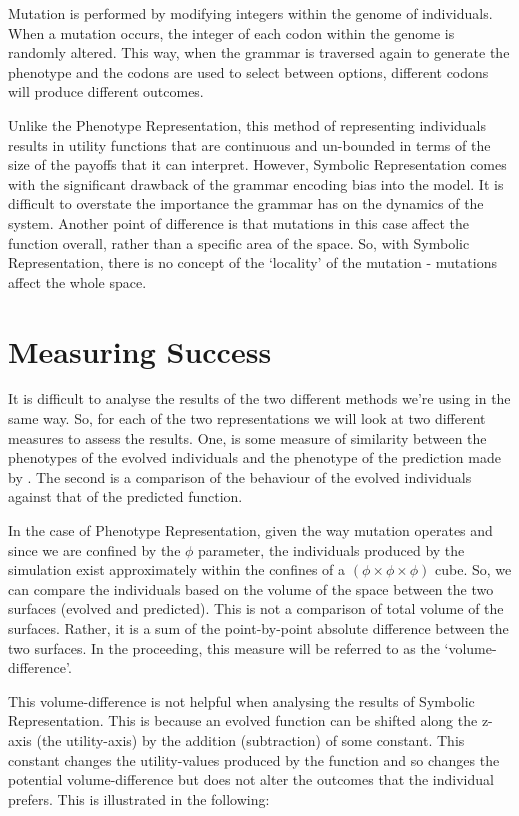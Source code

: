 \documentclass[11pt]{book}
\newcommand*{\np}{\par\noindent\newline}
\begin{document}
\np Mutation is performed by modifying integers within the genome of individuals.
When a mutation occurs, the integer of each codon within the genome is randomly altered.
This way, when the grammar is traversed again to generate the phenotype and the codons are used to select between options, different codons will produce different outcomes.

\np Unlike the Phenotype Representation, this method of representing individuals results in utility functions that are continuous and un-bounded in terms of the size of the payoffs that it can interpret.
However, Symbolic Representation comes with the significant drawback of the grammar encoding bias into the model.
It is difficult to overstate the importance the grammar has on the dynamics of the system.
Another point of difference is that mutations in this case affect the function overall, rather than a specific area of the space.
So, with Symbolic Representation, there is no concept of the `locality' of the mutation - mutations affect the whole space.


\section{Measuring Success}\label{success}
It is difficult to analyse the results of the two different methods we're using in the same way.
So, for each of the two representations we will look at two different measures to assess the results.
One, is some measure of similarity between the phenotypes of the evolved individuals and the phenotype of the prediction made by \citet{alger_generalization_2012}.
The second is a comparison of the behaviour of the evolved individuals against that of the predicted function.

\np In the case of Phenotype Representation, given the way mutation operates and since we are confined by the $\phi$ parameter, 
the individuals produced by the simulation exist approximately within the confines of a $(\phi \times \phi \times \phi)$ cube.
So, we can compare the individuals based on the volume of the space between the two surfaces (evolved and predicted).
This is not a comparison of total volume of the surfaces.
Rather, it is a sum of the point-by-point absolute difference between the two surfaces.
In the proceeding, this measure will be referred to as the `volume-difference'.

\np This volume-difference is not helpful when analysing the results of Symbolic Representation.
This is because an evolved function can be shifted along the z-axis (the utility-axis) by the addition (subtraction) of some constant.
This constant changes the utility-values produced by the function and so changes the potential volume-difference but does not alter the outcomes that the individual prefers.
This is illustrated in the following:
\end{document}
